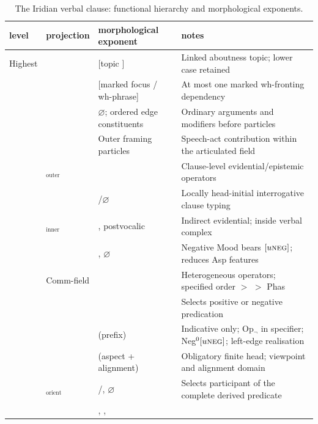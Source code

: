 \begin{table}[ht]
  \footnotesize
  \caption{The Iridian verbal clause: functional hierarchy and
  morphological exponents.}\label{tab:vm-full-structure}
  \begin{tabularx}{\textwidth}{l l l L}
    \toprule
    {\sc level} & {\sc projection} & {\sc morphological exponent}
    & {\sc notes} \\
    \midrule
    Highest &  & [topic ]
    & Linked aboutness topic; lower case retained \\
    &  & [marked focus / wh-phrase]
    & At most one marked wh-fronting dependency \\
    &  & $\varnothing$; ordered edge constituents
    & Ordinary arguments and modifiers before particles \\
    &  & Outer framing particles
    & Speech-act contribution within the articulated field \\
    & $_\text{outer}$ & 
    & Clause-level evidential/epistemic operators \\
    &  & /$\varnothing$
    & Locally head-initial interrogative clause typing \\
    \midrule
    & $_\text{inner}$ & , postvocalic 
    & Indirect evidential; inside verbal complex \\
    &  & , $\varnothing$
    & Negative Mood bears $[u\textsc{neg}]$; reduces Asp features \\
    & Comm-field & 
    & Heterogeneous operators; specified order  $>$  $>$ Phas \\
    &  & 
    & Selects positive or negative predication \\
    &  &  (prefix)
    & Indicative only; Op$_{\neg}$ in specifier; Neg$^{0}[u\textsc{neg}]$; left-edge realisation \\
    &  &  (aspect + alignment)
    & Obligatory finite head; viewpoint and alignment domain \\
    \midrule
    & $_{\mathrm{orient}}$ & /, $\varnothing$
    & Selects participant of the complete derived predicate \\
    &  & , , 

\end{tabularx}
\end{table}

